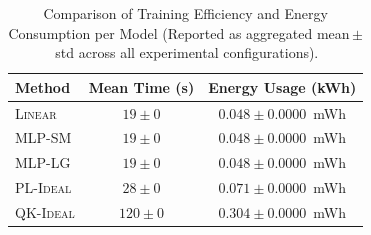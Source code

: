 \begin{table}[ht]
\centering
\caption{Comparison of Training Efficiency and Energy Consumption per Model (Reported as aggregated mean\,$\pm$\,std across all experimental configurations).}
\label{tab:efficiency}
\begin{tabular}{lcc}
\toprule
\textbf{Method} & \textbf{Mean Time (s)} & \textbf{Energy Usage (kWh)} \\
\midrule
\textsc{Linear} & $19 \pm 0$ & $0.048 \pm 0.0000$~mWh \\
\textsc{MLP-SM} & $19 \pm 0$ & $0.048 \pm 0.0000$~mWh \\
\textsc{MLP-LG} & $19 \pm 0$ & $0.048 \pm 0.0000$~mWh \\
\textsc{PL-Ideal} & $28 \pm 0$ & $0.071 \pm 0.0000$~mWh \\
\textsc{QK-Ideal} & $120 \pm 0$ & $0.304 \pm 0.0000$~mWh \\
\bottomrule
\end{tabular}
\end{table}
